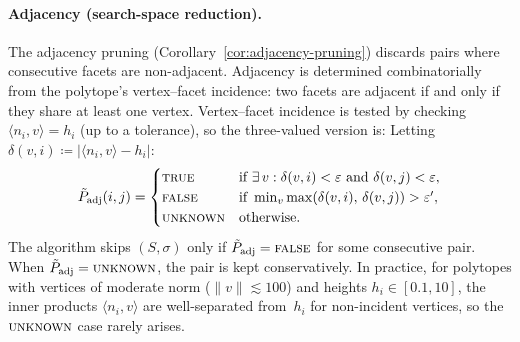 \paragraph{Adjacency (search-space reduction).}
The adjacency pruning
(Corollary~\ref{cor:adjacency-pruning})
discards pairs where consecutive facets are non-adjacent.
Adjacency is determined combinatorially from the polytope's
vertex--facet incidence: two facets are adjacent if and only if
they share at least one vertex.
Vertex--facet incidence is tested by checking
$\langle n_i, v \rangle = h_i$ (up to a tolerance), so the
three-valued version is:
Letting $\delta(v,i) \coloneqq |\langle n_i, v \rangle - h_i|$:
\[
  \tilde P_{\text{adj}}(i,j) =
  \begin{cases}
    \textsc{true}
      & \text{if } \exists\, v : \delta(v,i) < \varepsilon
        \text{ and } \delta(v,j) < \varepsilon, \\
    \textsc{false}
      & \text{if } \min_v \max(\delta(v,i),\, \delta(v,j))
        > \varepsilon', \\
    \textsc{unknown}
      & \text{otherwise.}
  \end{cases}
\]
The algorithm skips $(S, \sigma)$ only if
$\tilde P_{\text{adj}} = \textsc{false}$ for some
consecutive pair.
When $\tilde P_{\text{adj}} = \textsc{unknown}$, the pair
is kept conservatively.
In practice, for polytopes with vertices of moderate norm
($\|v\| \lesssim 100$) and heights $h_i \in [0.1, 10]$,
the inner products $\langle n_i, v \rangle$ are well-separated
from~$h_i$ for non-incident vertices, so the $\textsc{unknown}$
case rarely arises.

